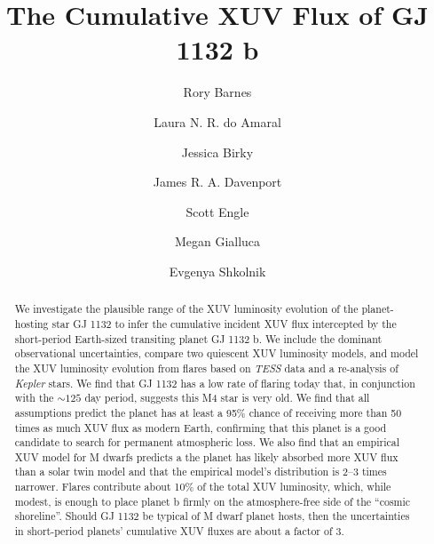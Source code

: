 \documentclass[preprint]{aastex631}
\def\tess{{\it TESS}\xspace}
\def\kepler{{\it Kepler}\xspace}
\begin{document}
\title{The Cumulative XUV Flux of GJ 1132 b}

\author[0000-0001-6487-5445]{Rory Barnes}

\author[0000-0002-8341-0376]{Laura N. R. do Amaral}

\author[0000-0002-7961-6881]{Jessica Birky}

\author[0000-0002-0637-835X]{James R. A. Davenport}

\author[0000-0002-0637-835X]{Scott Engle}

\author{Megan Gialluca}

\author[0000-0002-0637-835X]{Evgenya Shkolnik}


\begin{abstract}
    We investigate the plausible range of the XUV luminosity evolution of the planet-hosting star GJ 1132 to infer the cumulative incident XUV flux intercepted by the short-period Earth-sized transiting planet GJ 1132 b. We include the dominant observational uncertainties, compare two quiescent XUV luminosity models, and model the XUV luminosity evolution from flares based on \tess data and a re-analysis of \kepler stars. We find that GJ 1132 has a low rate of flaring today that, in conjunction with the $\sim125$ day period, suggests this M4 star is very old. We find that all assumptions predict the planet has at least a 95\% chance of receiving more than 50 times as much XUV flux as modern Earth, confirming that this planet is a good candidate to search for permanent atmospheric loss. We also find that an empirical XUV model for M dwarfs predicts a the planet has likely absorbed more XUV flux than a solar twin model and that the empirical model's distribution is 2--3 times narrower.  Flares contribute about 10\% of the total XUV luminosity, which, while modest, is enough to place planet b firmly on the  atmosphere-free side of the ``cosmic shoreline''. Should GJ 1132 be typical of M dwarf planet hosts, then the uncertainties in short-period planets' cumulative XUV fluxes are about a factor of 3.  
\end{abstract}
\end{document}
